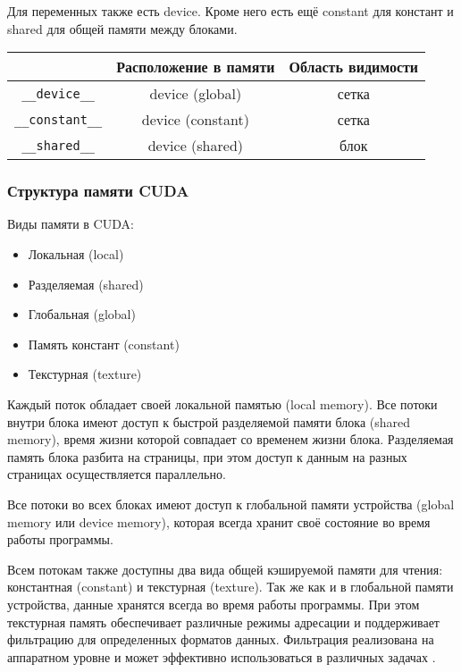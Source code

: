 Для переменных также есть device. Кроме него есть ещё constant для констант и shared для общей памяти между блоками.

\begin{table}[H]
    \begin{tabularx}{\textwidth}{|c|C|C|}
    \hline
                    & \textbf{Расположение в памяти} & \textbf{Область видимости} \\ \hline
    \texttt{\_\_device\_\_}      & device (global)       & сетка \\ \hline
    \texttt{\_\_constant\_\_}    & device (constant)     & сетка \\ \hline
    \texttt{\_\_shared\_\_}      & device (shared)       & блок  \\ \hline
    \end{tabularx}
\end{table}

\subsubsection*{Структура памяти CUDA}
Виды памяти в CUDA:
\begin{itemize}
    \item Локальная (local)
    \item Разделяемая (shared)
    \item Глобальная (global)
    \item Память констант (constant)
    \item Текстурная (texture)
\end{itemize}

Каждый поток обладает своей локальной памятью (local memory).
Все потоки внутри блока имеют доступ к быстрой разделяемой памяти блока (shared memory), время жизни которой совпадает со временем жизни блока. Разделяемая память блока разбита на страницы, при этом доступ к данным на разных страницах осуществляется параллельно.

Все потоки во всех блоках имеют доступ к глобальной памяти устройства (global memory или device memory), которая всегда хранит своё состояние во время работы программы.

Всем потокам также доступны два вида общей кэшируемой памяти для чтения: константная (constant) и текстурная (texture). Так же как и в глобальной памяти устройства, данные хранятся всегда во время работы программы. При этом текстурная память обеспечивает различные режимы адресации и поддерживает фильтрацию для определенных форматов данных. Фильтрация реализована на аппаратном уровне и может эффективно использоваться в различных задачах \cite{Gergel2016}.

